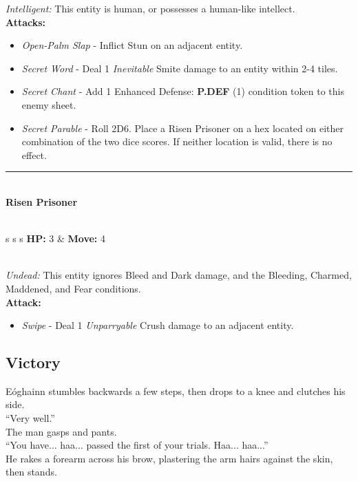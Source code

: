 \emph{Intelligent:} This entity is human, or possesses a human-like intellect.\\

\textbf{Attacks:}
\begin{itemize}
\item \emph{Open-Palm Slap} -  Inflict Stun on an adjacent entity.
\item \emph{Secret Word} - Deal 1 \emph{Inevitable} Smite damage to an entity within 2-4 tiles.
\item \emph{Secret Chant} - Add 1 Enhanced Defense: \textbf{P.DEF} (1) condition token to this enemy sheet.
\item \emph{Secret Parable} - Roll 2D6. Place a Risen Prisoner on a hex located on either combination of the two dice scores. If neither location is valid, there is no effect.
\end{itemize}
\hrule
\ \\
{\large \textbf{Risen Prisoner}}\\\\
\begin{tabular}{s s s}
\textbf{HP:} 3 & \textbf{Move:} 4\\
\end{tabular}\\

\emph{Undead:} This entity ignores Bleed and Dark damage, and the Bleeding, Charmed, Maddened, and Fear conditions.\\

\textbf{Attack:}
\begin{itemize}
\item \emph{Swipe} -  Deal 1 \emph{Unparryable} Crush damage to an adjacent entity.
\end{itemize}
\pagebreak

\subsection*{Victory}
Eóghainn stumbles backwards a few steps, then drops to a knee and clutches his side.\\

“Very well.”\\

The man gasps and pants.\\
“You have... haa... passed the first of your trials. Haa... haa...”\\

He rakes a forearm across his brow, plastering the arm hairs against the skin, then stands.\\

